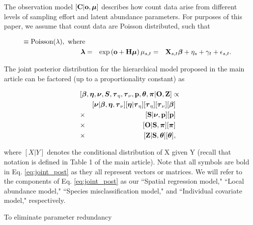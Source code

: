 \documentclass[12pt,fleqn]{article}
\begin{document}
\begin{flushleft}
The observation model $[{\bf C} | {\bf o}, \boldsymbol{\mu}]$ describes how count data arise from different levels of sampling effort and latent abundance parameters.  For purposes of this paper, we assume that count data are Poisson distributed, such that 

\begin{eqnarray*}
  [{\bf C} | {\bf o}, \boldsymbol{\mu}] \equiv \textrm{Poisson}({\bf \lambda}), \textrm{ where} \nonumber \\
  \boldsymbol{\lambda} & = & \exp \left( {\bf o} + {\bf H}\boldsymbol{\mu} \right)  
  \mu_{s,t} & = & {\bf X}_{s,t} \boldsymbol{\beta} + \eta_s + \gamma_t + \epsilon_{s,t}.
\end{eqnarray*}


The joint posterior distribution for the hierarchical model proposed in the main article can be factored (up to a proportionality constant) as
\begin{linenomath*}
\begin{eqnarray}
  \lefteqn{[\boldsymbol{\beta},\boldsymbol{\eta},\boldsymbol{\nu},\boldsymbol{S},\boldsymbol{\tau}_\eta,\boldsymbol{\tau}_\nu,
  {\bf p},\boldsymbol{\theta},\boldsymbol{\pi} | {\bf O},{\bf Z}] \propto }
  \label{eq:joint_post}
  \\
  & & [\boldsymbol{\nu}|\boldsymbol{\beta},\boldsymbol{\eta},\boldsymbol{\tau}_\nu][\boldsymbol{\eta}|\boldsymbol{\tau}_\eta][\boldsymbol{\tau}_\eta][\boldsymbol{\tau}_\nu][\boldsymbol{\beta}] \nonumber \\
  & \times & [{\bf S} | \boldsymbol{\nu}, {\bf p}][{\bf p}] \nonumber \\
  & \times & [{\bf O} | {\bf S},\boldsymbol{\pi}][\boldsymbol{\pi}] \nonumber \\
  & \times & [{\bf Z} | {\bf S},\boldsymbol{\theta}][\boldsymbol{\theta}], \nonumber
\end{eqnarray}
\end{linenomath*}
where $[X|Y]$ denotes the conditional distribution of X given Y (recall that notation is defined in Table 1 of the main article).  Note that all symbols are bold in Eq. \ref{eq:joint_post} as they all represent vectors or matrices.
We will refer to the components of Eq. \ref{eq:joint_post} as our ``Spatial regression model," ``Local abundance model," ``Species misclassification model," and ``Individual covariate model," respectively.

\hspace{.5in}To eliminate parameter redundancy

\renewcommand{\refname}{Literature Cited}




\end{flushleft}
\end{document}
